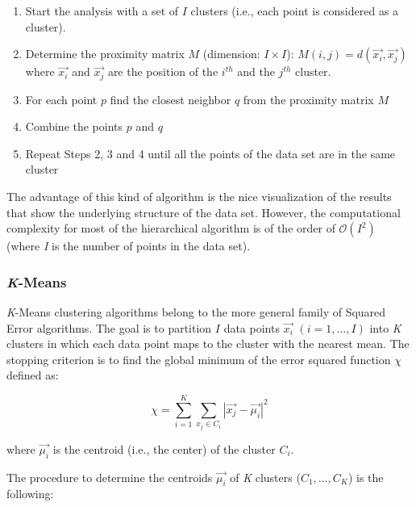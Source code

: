 \begin{enumerate}
  \item Start the analysis with a set of $I$ clusters (i.e., each point is considered as a cluster).
  \item Determine the proximity matrix $M$ (dimension: $I\times I$): $M(i,j)= d(\vec{x_{i}},\vec{x_{j}})$ where $\vec{x_{i}}$ and $\vec{x_{j}}$ are the position of the $i^{th}$ and the $j^{th}$ cluster.
  \item For each point $p$ find the closest neighbor $q$  from the proximity matrix $M$
  \item Combine the points $p$ and $q$
  \item Repeat Steps 2, 3 and 4 until all the points of the data set are in the same cluster
\end{enumerate}

The advantage of this kind of algorithm is the nice visualization of the results that show the underlying structure of the data set. However, the computational complexity for most of the hierarchical algorithm is of the order of $\mathcal{O}(I^{2})$ (where \emph{I} is the number of points in the data set).

\subsubsection{\emph{K}-Means}
\label{KMeans}

\emph{K}-Means clustering algorithms belong to the more general family of Squared Error algorithms. The goal is to partition $I$ data points $\vec{x_{i}}$ $(i=1,\ldots,I)$ into \emph{K} clusters in which each data point maps to the cluster with the nearest mean. The stopping criterion is to find the global minimum of the error squared function $\chi$ defined as:

\begin{equation}
    \chi = \displaystyle \sum_{i=1}^K \displaystyle \sum_{x_{j}\in C_{i}} |\vec{x_{j}}-\vec{\mu_{i}}|^{2}
\end{equation}

where $\vec{\mu_{i}}$ is the centroid (i.e., the center) of the cluster $C_{i}$.

The procedure to determine the centroids $\vec{\mu_{i}}$ of \emph{K} clusters (${C_{1},\ldots,C_{K}}$) is the following:

